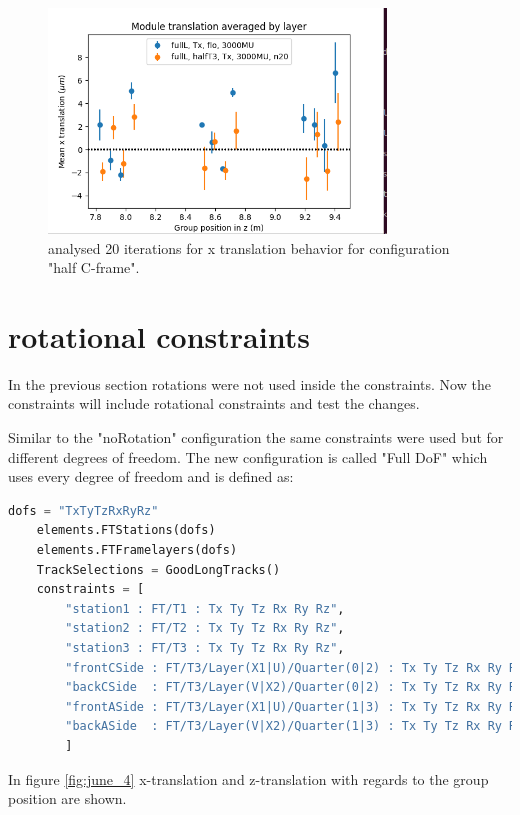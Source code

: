 \begin{figure}
  \centering
  \includegraphics[width=0.8\textwidth]{plots/june_21/allT_halfT3_n20_Tx.png}
  \caption{analysed 20 iterations for x translation behavior for configuration "half C-frame".}
  \label{fig:june_3}
\end{figure}

\section{rotational constraints}
In the previous section rotations were not used inside the constraints. Now the constraints will include rotational constraints and test the changes.

Similar to the "noRotation" configuration the same constraints were used but for different degrees of freedom. The new configuration is called "Full DoF" which uses every degree of freedom and is defined as:

\begin{lstlisting}[language=Python]
    dofs = "TxTyTzRxRyRz"
    elements.FTStations(dofs)
    elements.FTFramelayers(dofs)
    TrackSelections = GoodLongTracks()
    constraints = [
        "station1 : FT/T1 : Tx Ty Tz Rx Ry Rz",
        "station2 : FT/T2 : Tx Ty Tz Rx Ry Rz",
        "station3 : FT/T3 : Tx Ty Tz Rx Ry Rz",
        "frontCSide : FT/T3/Layer(X1|U)/Quarter(0|2) : Tx Ty Tz Rx Ry Rz",
        "backCSide  : FT/T3/Layer(V|X2)/Quarter(0|2) : Tx Ty Tz Rx Ry Rz",
        "frontASide : FT/T3/Layer(X1|U)/Quarter(1|3) : Tx Ty Tz Rx Ry Rz",
        "backASide  : FT/T3/Layer(V|X2)/Quarter(1|3) : Tx Ty Tz Rx Ry Rz"
        ]
\end{lstlisting}

In figure \ref{fig:june_4} x-translation and z-translation with regards to
the group position are shown.

